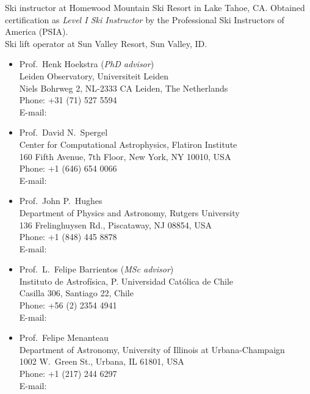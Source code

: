 \documentclass[11pt]{article}
\begin{document}



\noindent
{} Ski instructor at Homewood Mountain Ski Resort in Lake Tahoe, CA. Obtained certification as \emph{Level I Ski Instructor} by the Professional Ski Instructors of America (PSIA).\\
 Ski lift operator at Sun Valley Resort, Sun Valley, ID.\\



\begin{itemize}
 \item Prof.~Henk Hoekstra (\textit{PhD advisor})\\
       Leiden Observatory, Universiteit Leiden\\
       Niels Bohrweg 2, NL-2333 CA Leiden, The Netherlands\\
       Phone: +31 (71) 527 5594\\
       E-mail: 
 \item Prof.~David N.~Spergel\\
       Center for Computational Astrophysics, Flatiron Institute\\
       160 Fifth Avenue, 7th Floor, New York, NY 10010, USA\\
       Phone: +1 (646) 654 0066\\
       E-mail: 
 \item Prof.~John P.~Hughes\\
       Department of Physics and Astronomy, Rutgers University\\
       136 Frelinghuysen Rd., Piscataway, NJ 08854, USA\\
       Phone: +1 (848) 445 8878\\
       E-mail: 
 \item Prof.~L.~Felipe Barrientos (\textit{MSc advisor})\\
       Instituto de Astrof\'isica, P. Universidad Cat\'olica de Chile\\
       Casilla 306, Santiago 22, Chile\\
       Phone: +56 (2) 2354 4941\\
       E-mail: 
 \item Prof.~Felipe Menanteau\\
       Department of Astronomy, University of Illinois at Urbana-Champaign\\
       1002 W.\ Green St., Urbana, IL 61801, USA\\
       Phone: +1 (217) 244 6297\\
       E-mail: 
\end{itemize}
\end{document}
